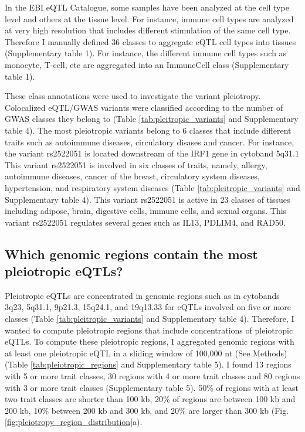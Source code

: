 In the EBI eQTL Catalogue, some samples have been analyzed at the cell type level and others at the tissue level.
%
For instance, immune cell types are analyzed at very high resolution that includes different stimulation of the same cell type.
%
Therefore I manually defined 36 classes to aggregate eQTL cell types into tissues (Supplementary table 1).
%
For instance, the different immune cell types such as monocyte, T-cell, etc are aggregated into an ImmuneCell class (Supplementary table 1).

These class annotations were used to investigate the variant pleiotropy.
%
Colocalized eQTL/GWAS variants were classified according to the number of GWAS classes they belong to (Table \ref{tab:pleitropic_variants} and Supplementary table 4).
%
The most pleiotropic variants belong to 6 classes that include different traits such as autoimmune diseases, circulatory disases and cancer.
%
For instance, the variant rs2522051 is located downstream of the IRF1 gene in cytoband 5q31.1
%
This variant rs2522051 is involved in six classes of traits, namely,
allergy, autoimmune diseases, cancer of the breast, circulatory system diseases, hypertension, and respiratory system diseases
(Table \ref{tab:pleitropic_variants} and Supplementary table 4).
%
This variant rs2522051 is active in 23 classes of tissues including adipose, brain, digestive cells, immune cells, and sexual organs.
%
This variant rs2522051 regulates several genes such as IL13, PDLIM4, and RAD50.

\subsection*{Which genomic regions contain the most pleiotropic eQTLs?}

Pleiotropic eQTLs are concentrated in genomic regions such as in cytobands 3q23,
5q31.1, 9p21.3, 15q24.1, and 19q13.33 for eQTLs involved on five or more classes (Table \ref{tab:pleitropic_variants} and Supplementary table 4).
%
Therefore, I wanted to compute pleiotropic regions that include concentrations of pleiotropic eQTLs.
%
To compute these pleiotropic regions, I aggregated genomic regions with at least one pleiotropic eQTL in a sliding
window of 100,000 nt (See Methods) (Table \ref{tab:pleiotropic_regions} and Supplementary table 5).
%
I found 13 regions with 5 or more trait classes, 30 regions with 4 or more trait
classes and 80 regions with 3 or more trait classes (Supplementary table 5).
%
50\% of regions with at least two trait classes are shorter than 100 kb, 20\% of regions are
between 100 kb and 200 kb, 10\% between 200 kb and 300 kb, and 20\% are larger than 300 kb (Fig. \ref{fig:pleiotropy_region_distribution}a).

